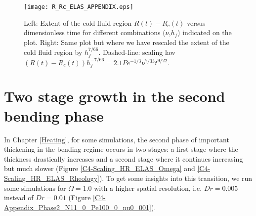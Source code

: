 \begin{figure}[h!]
  \begin{center}
    \graphicspath{ {/Users/thorey/Documents/These/Projet/Refroidissement/Skin_Model/Figure/JFM_V13/} }
    \texttt{[image: R\_Rc\_ELAS\_APPENDIX.eps]}
    \caption{Left:  Extent  of  the cold  fluid  region  $R(t)-R_c(t)$
      versus   dimensionless    time   for    different   combinations
      ($\nu$,$h_f$) indicated on the plot.  Right: Same plot but where
      we  have  rescaled  the  extent  of the  cold  fluid  region  by
      $h_f^{7/66}$.          Dashed-line:          scaling         law
      $(R(t)-R_c(t))h_f^{-7/66}= 2.1 Pe^{-1/3}\nu^{7/33}t^{9/22}$.}
    \label{R_Rc_ELAS_APPENDIX}
  \end{center}
\end{figure}

\section{Two stage growth in the second bending phase}
\label{C4-Heat:AppendixC}

In Chapter  \ref{Heating}, for some  simulations, the second  phase of
important thickening  in the  bending regime occurs  in two  stages: a
first stage  where the  thickness drastically  increases and  a second
stage  where   it  continues   increasing  but  much   slower  (Figure
\ref{C4-Scaling_HR_ELAS_Omega} and \ref{C4-Scaling_HR_ELAS_Rheology}).
To get some insights into this transition, we run some simulations for
$\Omega=1.0$  with  a  higher  spatial  resolution,  i.e.   $Dr=0.005$
instead               of               $Dr=0.01$               (Figure
\ref{C4-Appendix_Phase2_N11_0_Pe100_0_nu0_001}).

